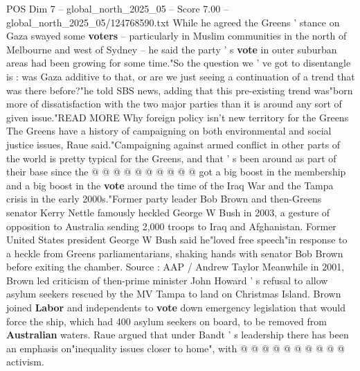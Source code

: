 \begin{textsample}{POS Dim 7 – global\_north\_2025\_05 – Score 7.00 – global\_north\_2025\_05/124768590.txt}
While he agreed the Greens ' stance on Gaza swayed some \textbf{voters} -- particularly in Muslim communities in the north of Melbourne and west of Sydney -- he said the party ' s \textbf{vote} in outer suburban areas had been growing for some time."So the question we ' ve got to disentangle is : was Gaza additive to that, or are we just seeing a continuation of a trend that was there before?"he told SBS news, adding that this pre-existing trend was"born more of dissatisfaction with the two major parties than it is around any sort of given issue."READ MORE Why foreign policy isn't new territory for the Greens The Greens have a history of campaigning on both environmental and social justice issues, Raue said."Campaigning against armed conflict in other parts of the world is pretty typical for the Greens, and that ' s been around as part of their base since the @ @ @ @ @ @ @ @ @ @ got a big boost in the membership and a big boost in the \textbf{vote} around the time of the Iraq War and the Tampa crisis in the early 2000s."Former party leader Bob Brown and then-Greens senator Kerry Nettle famously heckled George W Bush in 2003, a gesture of opposition to Australia sending 2,000 troops to Iraq and Afghanistan.
Former United States president George W Bush said he"loved free speech"in response to a heckle from Greens parliamentarians, shaking hands with senator Bob Brown before exiting the chamber.
Source : AAP / Andrew Taylor Meanwhile in 2001, Brown led criticism of then-prime minister John Howard ' s refusal to allow asylum seekers rescued by the MV Tampa to land on Christmas Island.
Brown joined \textbf{Labor} and independents to \textbf{vote} down emergency legislation that would force the ship, which had 400 asylum seekers on board, to be removed from \textbf{Australian} waters.
Raue argued that under Bandt ' s leadership there has been an emphasis on"inequality issues closer to home", with @ @ @ @ @ @ @ @ @ @ activism.

\end{textsample}
